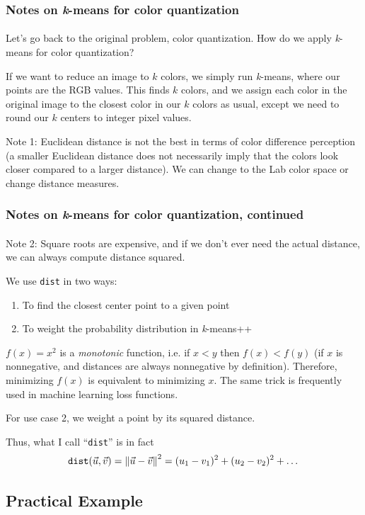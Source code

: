 \documentclass{beamer}                             %
\begin{document}
\begin{frame}
\frametitle{Notes on \textit{k}-means for color quantization}
\framesubtitle{}
Let's go back to the original problem, color quantization.
How do we apply \textit{k}-means for color quantization? \pause

If we want to reduce an image to \( k \) colors, we simply run \textit{k}-means,
where our points are the RGB values. This finds \( k \) colors,
and we assign each color in the original image
to the closest color in our \( k \) colors as usual, except we need to round
our \( k \) centers to integer pixel values. \pause 

Note 1: Euclidean distance is not the best in terms of
color difference perception (a smaller Euclidean distance does not necessarily
imply that the colors look closer compared to a larger distance).
We can change to the Lab color space or change distance measures.
\end{frame}

\begin{frame}
\frametitle{Notes on \textit{k}-means for color quantization, continued}
\framesubtitle{}
Note 2: Square roots are expensive, and if we don't ever need the
actual distance, we can always compute distance squared. \pause

We use \texttt{dist} in two ways:
\begin{enumerate}
  \item To find the closest center point to a given point
  \item To weight the probability distribution in \textit{k}-means++
\end{enumerate} \pause 

\( f(x) = x^2 \) is a \textit{monotonic} function,
i.e. if \( x < y \) then \( f(x) < f(y) \) (if \( x \) is nonnegative,
and distances are always nonnegative by definition).
Therefore, minimizing \( f(x) \) is equivalent to  minimizing \( x \).
The same trick is frequently used in machine learning loss functions. \pause

For use case 2, we weight a point by its squared distance.

Thus, what I call \enquote{\texttt{dist}} is in fact
\[ \texttt{dist}(\vec{u}, \vec{v}) = \norm{\vec{u} - \vec{v}}^2
= (u_1 - v_1)^2 + (u_2 - v_2)^2 + \dots \]
\end{frame}

\subsection{Practical Example}
\end{document}
